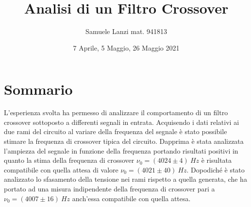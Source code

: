 \documentclass[12pt]{article}
\title{Analisi di un Filtro Crossover}
\author{Samuele Lanzi mat. 941813}
\date{7 Aprile, 5 Maggio, 26 Maggio 2021}
\begin{document}
\maketitle
\section{Sommario}
L'esperienza svolta ha permesso di analizzare il comportamento di un filtro crossover sottoposto a differenti 
segnali in entrata. Acquisendo i dati relativi ai due rami del circuito al variare della frequenza del segnale è stato possibile stimare
la frequenza di crossover tipica del circuito. Dapprima è stata analizzata l'ampiezza del segnale in funzione della frequenza portando 
risultati positivi in quanto la stima della frequenza di crossover $\nu_0 = (4024 \pm 4) \ Hz$ è risultata compatibile 
con quella attesa di valore $\nu_0 = (4021 \pm 40) \ Hz$. Dopodiché è stato analizzato lo sfasamento della tensione 
nei rami rispetto a quella generata, che ha portato ad una misura indipendente della frequenza di crossover pari a $\nu_0=(4007\pm 16) \ Hz$ 
anch'essa compatibile con quella attesa.
\end{document}
